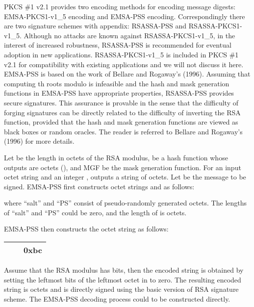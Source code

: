 \documentclass{article}
\begin{document}
PKCS \#1 v2.1 provides two encoding methods
for encoding message digests: EMSA-PKCS1-v1\_5 encoding
and EMSA-PSS encoding. Correspondingly there are 
two signature schemes with appendix: 
RSASSA-PSS and RSASSA-PKCS1-v1\_5. Although no attacks are known 
against RSASSA-PKCS1-v1\_5, in the interest of increased robustness, 
RSASSA-PSS is recommended for eventual adoption in new applications. 
RSASSA-PKCS1-v1\_5 is included in PKCS \#1 v2.1 for compatibility 
with existing applications and we will not discuss it here.
EMSA-PSS is based on the work of Bellare and Rogaway's (1996).
Assuming that computing th roots modulo  is infeasible and 
the hash and mask generation functions in EMSA-PSS have appropriate 
properties, RSASSA-PSS provides secure signatures. This assurance 
is provable in the sense that the difficulty of forging signatures 
can be directly related to the difficulty of inverting the RSA 
function, provided that the hash and mask generation functions 
are viewed as black boxes or random oracles. The reader is referred to
Bellare and Rogaway's (1996) for more details.

Let  be the length in octets of the RSA modulus,
 be a hash function whose outputs are
 octets (), and MGF be the mask generation function. For 
an input octet string  and an integer ,  
outputs a string of  octets. Let  be the message to be signed.
EMSA-PSS first constructs octet strings  and  as follows:

where ``salt'' and ``PS'' consist of pseudo-randomly generated octets.
The lengths of ``salt'' and ``PS''  could be zero, and the length of 
 is  octets.

EMSA-PSS then constructs the octet string  as follows:
\begin{center}
\begin{tabular}{|c|c|c|}\hline
 &  & 0xbc \\ \hline
\end{tabular}
\end{center}
Assume that the RSA modulus has  bits, then the encoded
string  is obtained by setting the leftmost
 bits of the leftmost octet in  to zero.
The resulting encoded string  is  octets and is directly 
signed using the basic version of
RSA signature scheme. 
The EMSA-PSS decoding process could to be constructed
directly.
\end{document}
